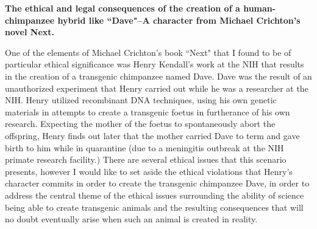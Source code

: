 \documentclass[letterpaper,10pt,twoside]{article}
\begin{document}
\begin{center}
\textbf{\large{The ethical and legal consequences of the creation of a human-chimpanzee hybrid like ``Dave"--A character from Michael Crichton's novel Next.}}
\end{center}
\vspace{0.5em}

One of the elements of Michael Crichton's book ``Next" that I found to be of particular ethical significance was Henry Kendall's work at the NIH that results in the creation of a transgenic chimpanzee named Dave.  Dave was the result of an unauthorized experiment that Henry carried out while he was a researcher at the NIH.  Henry utilized recombinant DNA techniques, using his own genetic materials in attempts to create a transgenic foetus in furtherance of his own research.  Expecting the mother of the foetus to spontaneously abort the offspring, Henry finds out later that the mother carried Dave to term and gave birth to him while in quarantine (due to a meningitis outbreak at the NIH primate research facility.)  There are several ethical issues that this scenario presents, however I would like to set aside the ethical violations that Henry's character commits in order to create the transgenic chimpanzee Dave, in order to address the central theme of the ethical issues surrounding the ability of science being able to create transgenic animals and the resulting consequences that will no doubt eventually arise when such an animal is created in reality.
\end{document}
